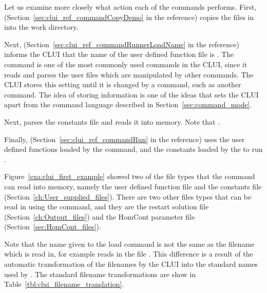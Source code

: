 \documentclass[12pt]{report}
\begin{document}
 Let us examine more closely what action each of the commands 
 performs.  First,  
 (Section~\ref{sec:clui_ref_commandCopyDemo} in the reference) copies the files in 
  into the work directory.  

 Next,  
 (Section~\ref{sec:clui_ref_commandRunnerLoadName} in the reference)
 informs the \AUTO CLUI that the name of
 the user defined function file is .  The command
  is one of the most commonly used commands in the
 \AUTO CLUI, since it reads and parses the user files which are
 manipulated by other commands.  The \AUTO CLUI stores this setting
 until it is changed by a command, such as another 
 command.  The idea of storing information is one of the ideas that
 sets the CLUI apart from the command language described in
 Section~\ref{sec:command_mode}.

 Next,  parses the \AUTO
 constants file  and reads it into memory.  Note that
 .  

 Finally,  
 (Section~\ref{sec:clui_ref_commandRun} in the reference)
 uses the user defined functions loaded
 by the  command, and the \AUTO constants
 loaded by the  to run \AUTO.

 Figure~\ref{exa:clui_first_example} showed two of 
 the file types that the 
  command can read into memory, namely 
 the user defined function file and the \AUTO constants
 file (Section~\ref{ch:User_supplied_files}).  
 There are two other files types that can be read
 in using the  command, and they are
 the restart solution file (Section~\ref{ch:Output_files})
 and the {\cal HomCont} parameter
 file (Section~\ref{sec:HomCont_files}).

 Note that the name given to the load
 command is not the same as the filename which is read
 in, for example  reads in 
 the file .  This difference is 
 a result of the automatic transformation of the
 filenames by the 
 \AUTO CLUI into the
 standard names used by \AUTO.  
 The standard filename
 transformations are show in Table~\ref{tbl:clui_filename_translation}. 
\end{document}
